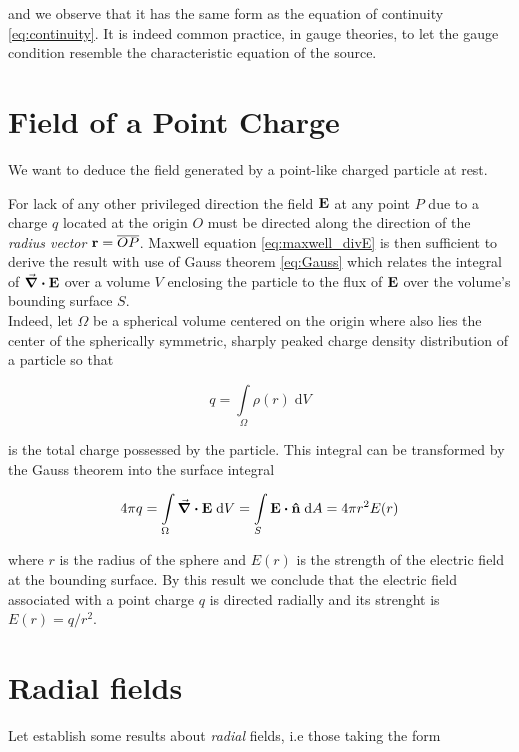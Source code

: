 and we observe that it has the same form as the equation of continuity \ref{eq:continuity}. It is indeed common practice, in gauge theories, to let the gauge condition resemble the characteristic equation of the source. 

\section{Field of a Point Charge} 
We want to deduce the field generated by a point-like charged particle at rest. 

For lack of any other privileged direction the field $\vb{E}$ at any point $P$ due to a charge $q$ located at the origin $O$ must be directed along the direction of the \textit{radius vector} $\vb{r} = \overline{OP}$. Maxwell equation \ref{eq:maxwell_divE} is then sufficient to derive the result with use of Gauss theorem \ref{eq:Gauss} which relates the integral of $\div{\vb{E}}$ over a volume $V$ enclosing the particle to the flux of $\vb{E}$ over the volume's bounding surface $S$. \\

Indeed, let $\Omega$ be a spherical volume centered on the origin where also lies the center of the spherically symmetric, sharply peaked charge density distribution of a particle so that 

\begin{equation}
q = \int\limits_{\Omega} \rho(r) \; \mathrm{d}V 
\end{equation}

is the total charge possessed by the particle. This integral can be transformed by the Gauss theorem into the surface integral 

\begin{equation}
4 \pi q = \int\limits_{\Omega}\div{\vb{E}} \; \mathrm{d}V = \int\limits_{S}\vb{E} \vdot \vu{n} \; \mathrm{d}A = 4 \pi r^2 E(r) \label{eq:pointcharge_flux}
\end{equation}

where $r$ is the radius of the sphere and $E(r)$ is the strength of the electric field at the bounding surface. By this result we conclude that the electric field associated with a point charge $q$ is directed radially and its strenght is
$E(r) = q/r^2$.



\section{Radial fields} 
Let establish some results about \textit{radial} fields, i.e those taking the form 

